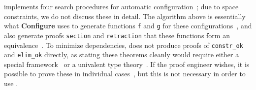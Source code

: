\toolname implements four search procedures for automatic configuration~;
due to space constraints, we do not discuss these in detail.
The algorithm above is essentially what \textbf{Configure} uses to generate functions \lstinline{f} and \lstinline{g} for these configurations~, %
and also generate proofs \lstinline{section} and \lstinline{retraction} that these functions form an equivalence~. %
To minimize dependencies, \toolname does not produce proofs of \lstinline{constr_ok} and \lstinline{elim_ok} directly,
as stating these theorems cleanly would require either a special framework~\cite{tabareau2017equivalences}
or a univalent type theory~\cite{univalent2013homotopy}.
If the proof engineer wishes, it is possible to prove these in individual cases~, %
but this is not necessary in order to use \toolname. %






